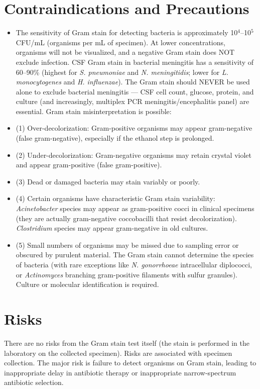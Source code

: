 \section*{Contraindications and Precautions}
\begin{itemize}
  \item The sensitivity of Gram stain for detecting bacteria is approximately 10$^{4}$--10$^{5}$ CFU/mL (organisms per mL of specimen). At lower concentrations, organisms will not be visualized, and a negative Gram stain does NOT exclude infection. CSF Gram stain in bacterial meningitis has a sensitivity of 60--90\% (highest for \textit{S. pneumoniae} and \textit{N. meningitidis}; lower for \textit{L. monocytogenes} and \textit{H. influenzae}). The Gram stain should NEVER be used alone to exclude bacterial meningitis --- CSF cell count, glucose, protein, and culture (and increasingly, multiplex PCR meningitis/encephalitis panel) are essential. Gram stain misinterpretation is possible:
  \item (1) Over-decolorization: Gram-positive organisms may appear gram-negative (false gram-negative), especially if the ethanol step is prolonged.
  \item (2) Under-decolorization: Gram-negative organisms may retain crystal violet and appear gram-positive (false gram-positive).
  \item (3) Dead or damaged bacteria may stain variably or poorly.
  \item (4) Certain organisms have characteristic Gram stain variability: \textit{Acinetobacter} species may appear as gram-positive cocci in clinical specimens (they are actually gram-negative coccobacilli that resist decolorization). \textit{Clostridium} species may appear gram-negative in old cultures.
  \item (5) Small numbers of organisms may be missed due to sampling error or obscured by purulent material. The Gram stain cannot determine the species of bacteria (with rare exceptions like \textit{N. gonorrhoeae} intracellular diplococci, or \textit{Actinomyces} branching gram-positive filaments with sulfur granules). Culture or molecular identification is required.
\end{itemize}
\section*{Risks}
There are no risks from the Gram stain test itself (the stain is performed in the laboratory on the collected specimen). Risks are associated with specimen collection. The major risk is failure to detect organisms on Gram stain, leading to inappropriate delay in antibiotic therapy or inappropriate narrow-spectrum antibiotic selection.

